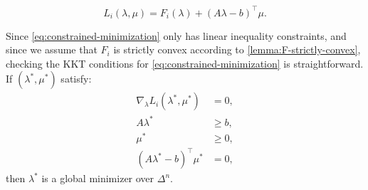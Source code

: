 \documentclass[eikonal.tex]{subfiles}
\begin{document}
\begin{equation}
  L_i(\lambda, \mu) = F_i(\lambda) + {(A\lambda - b)}^\top \mu.
\end{equation}

Since \cref{eq:constrained-minimization} only has linear inequality
constraints, and since we assume that $F_i$ is strictly convex
according to \cref{lemma:F-strictly-convex}, checking the KKT
conditions for \cref{eq:constrained-minimization} is
straightforward. If $(\lambda^*, \mu^*)$ satisfy:
\begin{equation}
  \label{eq:kkt}
  \begin{split}
    \nabla_\lambda L_i(\lambda^*, \mu^*) &= 0, \\
    A\lambda^* &\geq b, \\
    \mu^* &\geq 0, \\
    (A\lambda^* - b)^\top \mu^* &= 0,
  \end{split}
\end{equation}
then $\lambda^*$ is a global minimizer over $\Delta^n$.
\end{document}
